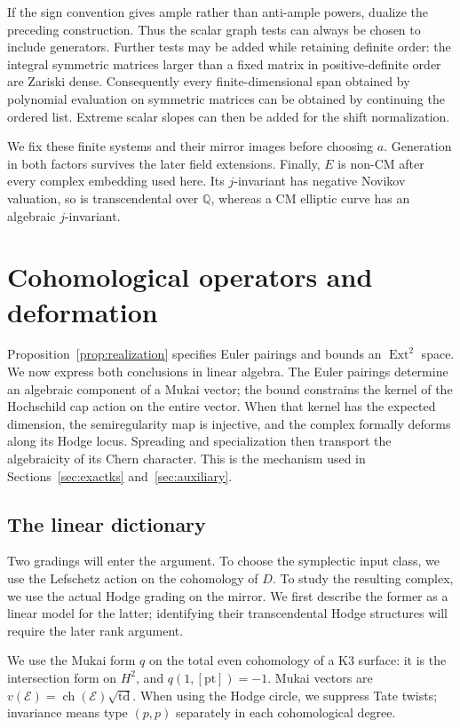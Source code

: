 \documentclass[11pt]{article}
\numberwithin{equation}{section}
\theoremstyle{definition}
\theoremstyle{remark}
\newcommand{\Q}{\mathbb Q}
\DeclareMathOperator{\Ext}{Ext}
\DeclareMathOperator{\td}{td}
\DeclareMathOperator{\ch}{ch}
\begin{document}
If the sign convention gives ample rather than anti-ample powers,
dualize the preceding construction.  Thus the scalar graph tests can
always be chosen to include generators.  Further tests may be added
while retaining definite order: the integral symmetric matrices larger
than a fixed matrix in positive-definite order are Zariski dense.
Consequently every finite-dimensional span obtained by polynomial
evaluation on symmetric matrices can be obtained by continuing the
ordered list.  Extreme scalar slopes can then be added for the shift
normalization.

We fix these finite systems and their mirror images before choosing
$a$.  Generation in both factors survives the later field extensions.
Finally, $E$ is non-CM after every complex embedding used here.  Its
$j$-invariant has negative Novikov valuation, so is transcendental over
$\Q$, whereas a CM elliptic curve has an algebraic $j$-invariant.

\section{Cohomological operators and deformation}\label{sec:cohomology}

Proposition~\ref{prop:realization} specifies Euler pairings and bounds an
\(\Ext^2\) space.  We now express both conclusions in linear algebra.
The Euler pairings determine an algebraic component of a Mukai vector;
the bound constrains the kernel of the Hochschild cap action on the
entire vector.  When that kernel has the expected dimension, the
semiregularity map is injective, and the complex formally deforms along
its Hodge locus.  Spreading and specialization then transport the
algebraicity of its Chern character.  This is the mechanism used in
Sections~\ref{sec:exactks} and~\ref{sec:auxiliary}.

\subsection{The linear dictionary}

Two gradings will enter the argument.  To choose the symplectic input
class, we use the Lefschetz action on the cohomology of \(D\).  To study
the resulting complex, we use the actual Hodge grading on the mirror.
We first describe the former as a linear model for the latter; identifying
their transcendental Hodge structures will require the later rank argument.

We use the Mukai form \(q\) on the total even cohomology of a K3
surface: it is the intersection form on \(H^2\), and
\(q(1,[\mathrm{pt}])=-1\).  Mukai vectors are
\(v(\mathcal E)=\ch(\mathcal E)\sqrt{\td}\).
When using the Hodge circle, we suppress Tate twists; invariance means
type \((p,p)\) separately in each cohomological degree.
\end{document}
